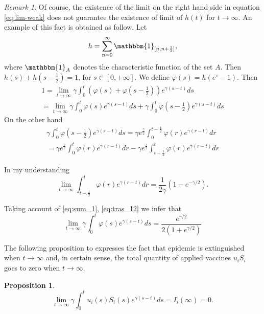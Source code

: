 \documentclass[a4paper,10pt]{article}
\newtheorem{prop}[thm]{Proposition}
\theoremstyle{remark}
\newtheorem{comentario}{Remark}
\begin{document}
\begin{comentario} Of course, the existence of the limit on the right hand side in equation \eqref{eq:lim-weak}   does not guarantee the existence of limit of $h(t)$ for $t\to\infty$. An example of this fact is obtained as follow. Let 
\[
 h=\sum_{n=0}^{\infty}\mathbbm{1}_{[n,n+\frac12]},
\]
where $\mathbbm{1}_{A}$ denotes the characteristic function of the set $A$.  Then $h(s)+h(s-\frac12)=1$, for $s\in [0,+\infty]$. 
We define $\varphi(s)=h(e^s-1)$. Then
\begin{multline}\label{eq:sum_1}
 1=\lim\limits_{t\to\infty}\gamma\int_0^t \left(\varphi(s)+\varphi\left(s-\frac12\right)
 \right) e^{\gamma (s-t)}ds\\=\lim\limits_{t\to\infty}\gamma\int_0^t\varphi(s)e^{\gamma (s-t)}ds+ \gamma\int_0^t \varphi\left(s-\frac12\right)
  e^{\gamma (s-t)}ds
\end{multline}
On the other hand
\begin{multline}\label{eq:tras_12}
 \gamma\int_0^t \varphi\left(s-\frac12\right)
  e^{\gamma (s-t)}ds= \gamma e^{\frac{\gamma}{2}}\int_0^{t-\frac12} \varphi\left(r\right)
  e^{\gamma (r-t)}dr\\=\gamma e^{\frac{\gamma}{2}}\int_0^{t} \varphi\left(r\right)
  e^{\gamma (r-t)}dr-
  \gamma e^{\frac{\gamma}{2}}\int_{t-\frac12}^{t} \varphi\left(r\right)
  e^{\gamma (r-t)}dr
\end{multline}

In my understanding
\[
\lim\limits_{t\to\infty} \int_{t-\frac12}^{t} \varphi\left(r\right)
  e^{\gamma (r-t)}dr= \frac{1}{2\gamma}(1-e^{-\gamma/2}).
\]

Taking account of \eqref{eq:sum_1}, \eqref{eq:tras_12} we infer that 
\[
\lim\limits_{t\to\infty} \gamma \int_{0}^{t} \varphi\left(s\right)
  e^{\gamma (s-t)}ds=\frac{e^{\gamma/2}}{2(1+e^{\gamma/2})}
\]


\end{comentario}

The following proposition to expresses the fact that epidemic is extinguished when $t\to\infty$ and, in certain sense, the total quantity of applied vaccines $ u_iS_i$ goes to zero when $t\to\infty$.   

\begin{prop} 
\[
 \lim\limits_{t\to\infty}\gamma\int_0^t  u_i(s)S_i(s)
  e^{\gamma (s-t)}ds=I_i(\infty)=0.
\]

 
\end{prop}
\end{document}
